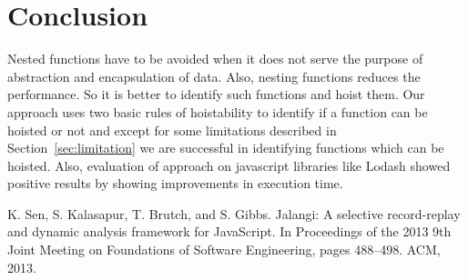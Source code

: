 \documentclass[authoryear,preprint]{sigplanconf}
\begin{document}
\section{Conclusion}
\label{sec:conclusion}
Nested functions have to be avoided when it does not serve the purpose of abstraction and encapsulation of data. Also, nesting functions reduces the performance. So it is better to identify such functions and hoist them. Our approach uses two basic rules of hoistability to identify if a function can be hoisted or not and except for some limitations described in Section~\ref{sec:limitation} we are successful in identifying functions which can be hoisted. Also, evaluation of approach on javascript libraries like Lodash showed positive results by showing improvements in execution time.\par


\begin{thebibliography}{1}
\softraggedright


K. Sen, S. Kalasapur, T. Brutch, and S. Gibbs. Jalangi: A selective
record-replay and dynamic analysis framework for JavaScript. In Proceedings of the 2013 9th
Joint Meeting on Foundations of Software Engineering, pages 488–498. ACM, 2013.




\end{thebibliography}
\end{document}
